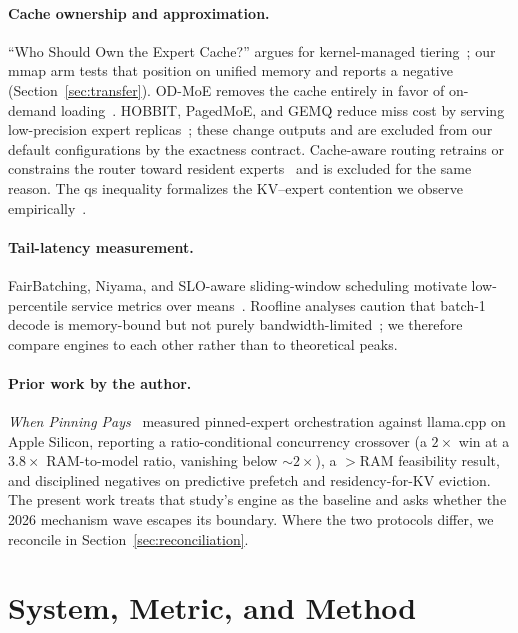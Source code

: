 \documentclass[11pt]{article}
\newcommand{\ppl}{\ensuremath{\times}}
\begin{document}
\paragraph{Cache ownership and approximation.}
``Who Should Own the Expert Cache?'' argues for kernel-managed
tiering~\cite{kernelcache}; our mmap arm tests that position on unified
memory and reports a negative (Section~\ref{sec:transfer}). OD-MoE removes
the cache entirely in favor of on-demand loading~\cite{odmoe}. HOBBIT,
PagedMoE, and GEMQ reduce miss cost by serving low-precision expert
replicas~\cite{hobbit,pagedmoe,gemq}; these change outputs and are excluded
from our default configurations by the exactness contract. Cache-aware
routing retrains or constrains the router toward resident
experts~\cite{cecar,psrouting,cacheaware} and is excluded for the same
reason. The qs inequality formalizes the KV--expert contention we observe
empirically~\cite{qsineq}.

\paragraph{Tail-latency measurement.}
FairBatching, Niyama, and SLO-aware sliding-window scheduling motivate
low-percentile service metrics over means~\cite{fairbatching,niyama,slosw}.
Roofline analyses caution that batch-1 decode is memory-bound but not purely
bandwidth-limited~\cite{memnotbw}; we therefore compare engines to each
other rather than to theoretical peaks.

\paragraph{Prior work by the author.}
\emph{When Pinning Pays}~\cite{hariri2026pinning} measured pinned-expert
orchestration against llama.cpp on Apple Silicon, reporting a
ratio-conditional concurrency crossover (a $2\ppl$ win at a $3.8\ppl$
RAM-to-model ratio, vanishing below ${\sim}2\ppl$), a $>$RAM feasibility
result, and disciplined negatives on predictive prefetch and
residency-for-KV eviction. The present work treats that study's engine as
the baseline and asks whether the 2026 mechanism wave escapes its boundary.
Where the two protocols differ, we reconcile in
Section~\ref{sec:reconciliation}.

\section{System, Metric, and Method}
\label{sec:method}
\end{document}
